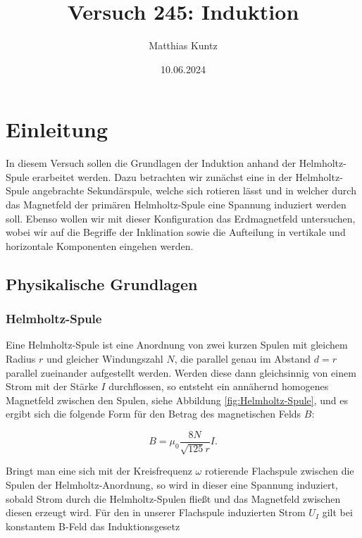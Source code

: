 \documentclass{article}
\title{Versuch 245: Induktion}
\author{Matthias Kuntz}
\date{10.06.2024}
\begin{document}
\maketitle

\tableofcontents

\newpage

\section{Einleitung}

In diesem Versuch sollen die Grundlagen der Induktion anhand der Helmholtz-Spule erarbeitet werden. Dazu betrachten wir zunächst eine in der Helmholtz-Spule angebrachte Sekundärspule, welche sich rotieren lässt und in welcher durch das Magnetfeld der primären Helmholtz-Spule eine Spannung induziert werden soll. Ebenso wollen wir mit dieser Konfiguration das Erdmagnetfeld untersuchen, wobei wir auf die Begriffe der Inklination sowie die Aufteilung in vertikale und horizontale Komponenten eingehen werden. 


\subsection{Physikalische Grundlagen}

\subsubsection{Helmholtz-Spule}

Eine Helmholtz-Spule ist eine Anordnung von zwei kurzen Spulen mit gleichem Radius $r$ und gleicher Windungszahl $N$, die parallel genau im Abstand $d = r$ parallel zueinander aufgestellt werden. Werden diese dann gleichsinnig von einem  Strom mit der Stärke $I$ durchflossen, so entsteht ein annähernd homogenes Magnetfeld zwischen den Spulen, siehe Abbildung \ref{fig:Helmholtz-Spule}, und es ergibt sich die folgende Form für den Betrag des magnetischen Felds $B$:

\begin{equation}
    B = \mu_0 \frac{8N}{\sqrt{125} r} I.
    \label{eq:Magnetfeld_THEO}
\end{equation}

Bringt man eine sich mit der Kreisfrequenz $\omega$ rotierende Flachspule zwischen die Spulen der Helmholtz-Anordnung, so wird in dieser eine Spannung induziert, sobald Strom durch die Helmholtz-Spulen fließt und das Magnetfeld zwischen diesen erzeugt wird. Für den in unserer Flachspule induzierten Strom $U_I$ gilt bei konstantem B-Feld das Induktionsgesetz
\end{document}
